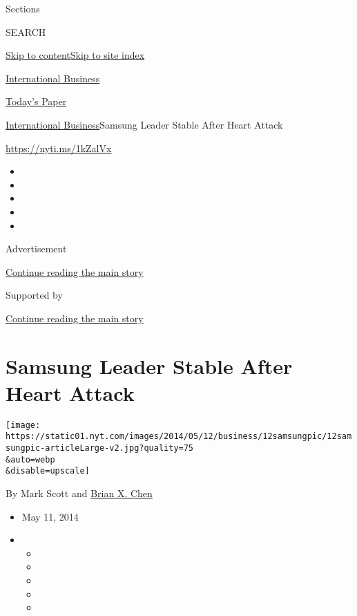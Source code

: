Sections

SEARCH

\protect\hyperlink{site-content}{Skip to
content}\protect\hyperlink{site-index}{Skip to site index}

\href{https://www.nytimes.com/section/business}{International Business}

\href{https://myaccount.nytimes.com/auth/login?response_type=cookie\&client_id=vi}{}

\href{https://www.nytimes.com/section/todayspaper}{Today's Paper}

\href{/section/business}{International Business}\textbar{}Samsung Leader
Stable After Heart Attack

\url{https://nyti.ms/1kZalVx}

\begin{itemize}
\item
\item
\item
\item
\item
\end{itemize}

Advertisement

\protect\hyperlink{after-top}{Continue reading the main story}

Supported by

\protect\hyperlink{after-sponsor}{Continue reading the main story}

\hypertarget{samsung-leader-stable-after-heart-attack}{%
\section{Samsung Leader Stable After Heart
Attack}\label{samsung-leader-stable-after-heart-attack}}

\texttt{[image: https://static01.nyt.com/images/2014/05/12/business/12samsungpic/12samsungpic-articleLarge-v2.jpg?quality=75\\\&auto=webp\\\&disable=upscale]}

By Mark Scott and \href{http://www.nytimes.com/by/brian-x-chen}{Brian X.
Chen}

\begin{itemize}
\item
  May 11, 2014
\item
  \begin{itemize}
  \item
  \item
  \item
  \item
  \item
  \end{itemize}
\end{itemize}

